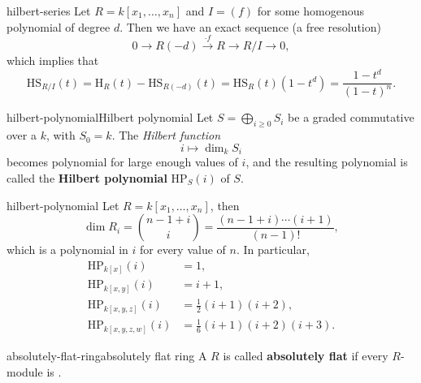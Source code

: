 \begin{example}{hilbert-series}
    Let $R = k[x_1, \ldots, x_n]$ and $I = (f)$ for some homogenous polynomial of degree $d$. Then we have an exact sequence (a free resolution)
    \[ 0 \to R(-d) \xrightarrow{\cdot f} R \to R / I \to 0 , \]
    which implies that
    \[ \text{HS}_{R/I}(t) = \text{H}_R(t) - \text{HS}_{R(-d)}(t) = \text{HS}_R(t) (1 - t^d) = \frac{1 - t^d}{(1 - t)^n}. \]
\end{example}

\begin{topic}{hilbert-polynomial}{Hilbert polynomial}
    Let $S = \bigoplus_{i \ge 0} S_i$ be a  graded commutative  over a  $k$, with $S_0 = k$. The \textit{Hilbert function}
    \[ i \mapsto \dim_k S_i \]
    becomes polynomial for large enough values of $i$, and the resulting polynomial is called the \textbf{Hilbert polynomial} $\text{HP}_S(i)$ of $S$.
\end{topic}

\begin{example}{hilbert-polynomial}
    Let $R = k[x_1, \ldots, x_n]$, then
    \[ \dim R_i = \binom{n - 1 + i}{i} = \frac{(n - 1 + i) \cdots (i + 1)}{(n - 1)!} , \]
    which is a polynomial in $i$ for every value of $n$. In particular,
    \[ \begin{aligned}
        \text{HP}_{k[x]}(i) &= 1, \\
        \text{HP}_{k[x, y]}(i) &= i + 1, \\
        \text{HP}_{k[x, y, z]}(i) &= \tfrac{1}{2} (i + 1)(i + 2), \\
        \text{HP}_{k[x, y, z, w]}(i) &= \tfrac{1}{6} (i + 1)(i + 2)(i + 3) .
    \end{aligned} \]
\end{example}

\begin{topic}{absolutely-flat-ring}{absolutely flat ring}
    A  $R$ is called \textbf{absolutely flat} if every $R$-module is .
\end{topic}

